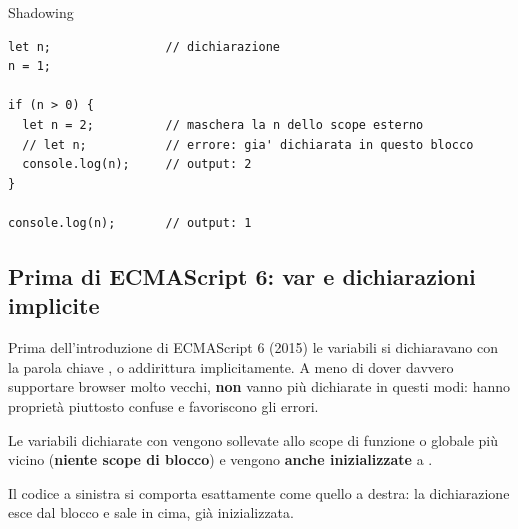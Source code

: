 \begin{esempio}{Shadowing}
\begin{affianco}[0.6][c]
\begin{lstlisting}[style=js, name=shadowing.js]
let n;                // dichiarazione
n = 1;

if (n > 0) {
  let n = 2;          // maschera la n dello scope esterno
  // let n;           // errore: gia' dichiarata in questo blocco
  console.log(n);     // output: 2
}

console.log(n);       // output: 1
\end{lstlisting}
\risultato
\begin{immagine}
\end{immagine}
\end{affianco}
\end{esempio}

\subsection{Prima di ECMAScript 6: var e dichiarazioni implicite}

Prima dell'introduzione di ECMAScript 6 (2015) le variabili si dichiaravano con
la parola chiave , o addirittura implicitamente. A meno di dover
davvero supportare browser molto vecchi, \textbf{non} vanno più dichiarate in
questi modi: hanno proprietà piuttosto confuse e favoriscono gli errori.

Le variabili dichiarate con  vengono sollevate allo scope di funzione
o globale più vicino (\textbf{niente scope di blocco}) e vengono \textbf{anche
inizializzate} a .

Il codice a sinistra si comporta esattamente come quello a destra: la
dichiarazione esce dal blocco e sale in cima, già inizializzata.

